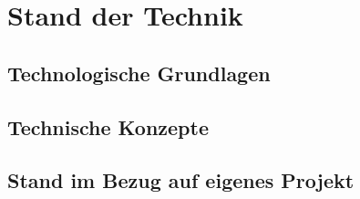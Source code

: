 \chapter{Stand der Technik}
\label{ch:StandDerTechnik}



\section{Technologische Grundlagen}

\section{Technische Konzepte}
\label{sec:technischeKonzepte}

\section{Stand im Bezug auf eigenes Projekt}

